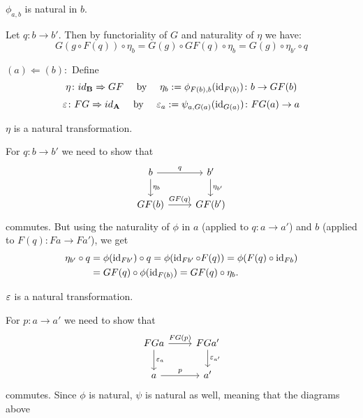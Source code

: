 \begin{bigproof}
\begin{smallproof}
\[    \]
\end{smallproof}
\begin{claim}
    $\phi_{a,b}$ is natural in $b$.
\end{claim}
\begin{smallproof}
    Let $q \colon b \to b'$. Then by functoriality of $G$ and naturality of $\eta$ we have: 
    \[
       G(g \circ F(q)) \circ \eta_b = G(g) \circ GF(q) \circ \eta_b
       = G(g) \circ \eta_{b'} \circ q
     \]
\end{smallproof}
$(a)\Leftarrow (b):$ Define 
\[
    \eta \colon id_{\mathbf{B}} \Rightarrow GF \quad \text{ by } \quad \eta_b := \phi_{F(b),b}(\operatorname{id}_{F(b)})
    \colon b \to GF(b) \\
\]
\[
    \varepsilon \colon FG \Rightarrow id_{\mathbf{A}} \quad \text{ by } \quad \varepsilon_a := \psi_{a,G(a)}(\operatorname{id}_{G(a)})
    \colon FG(a) \to a
\]
\begin{claim}
    $\eta$ is a natural transformation.
\end{claim}
\begin{smallproof}
    For $q \colon b \to b'$ we need to show that 
    \[
        \begin{tikzcd}
            b \arrow[r,"q"] \arrow[d,"\eta_b"] 
              & b' \arrow[d,"\eta_{b'}"] \\
            GF(b) \arrow[r,"GF(q)"]
              & GF(b')
        \end{tikzcd}
    \]
    commutes. But using the naturality of $\phi$ in $a$ (applied to $q \colon a \to a'$) and
    $b$ (applied to $F(q) \colon Fa \to Fa'$), we get
    \begin{align*}
        \eta_{b'} \circ q &= \phi(\operatorname{id}_{Fb'}) \circ q = \phi(\operatorname{id}_{Fb'} \circ F(q))  = \phi(F(q) \circ \operatorname{id}_{Fb}) \\
        &= GF(q) \circ \phi(\operatorname{id}_{F(b)}) = GF(q) \circ \eta_b.
    \end{align*}
\end{smallproof}
\begin{claim}
    $\varepsilon$ is a natural transformation.
\end{claim}
\begin{smallproof}
    For $p \colon a \to a'$ we need to show that
    \[
      \begin{tikzcd}
          FGa \arrow[r,"FG(p)"] \arrow[d,"\eps_a"] 
            & FGa' \arrow[d,"\eps_{a'}"] \\
          a \arrow[r,"p"]
            & a'
      \end{tikzcd}  
    \]
    commutes. Since $\phi$ is natural, $\psi$ is natural as well, meaning that the diagrams above

\end{smallproof}
\end{bigproof}
